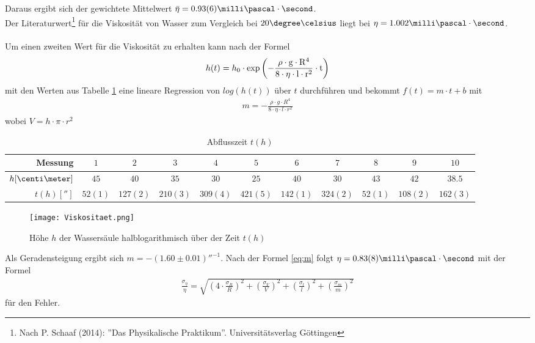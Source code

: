 \documentclass[12pt, a4paper, twoside]{scrartcl}
\begin{document}
Daraus ergibt sich der gewichtete Mittelwert $\bar{\eta}=0.93(6) \milli\pascal\cdot\second$. \\
Der Literaturwert\footnote{Nach P. Schaaf (2014): ”Das Physikalische Praktikum”. Universitätsverlag Göttingen} für die Viskosität von Wasser zum Vergleich bei $20\degree\celsius$ liegt bei $\eta = 1.002 \milli\pascal\cdot\second$.
\\
\\
Um einen zweiten Wert für die Viskosität zu erhalten kann nach der Formel 
\begin{align}
 h(t) = h_0 \cdot \rm{exp}\left(-\frac{\rho\cdot g\cdot R^{4}}{8\cdot\eta\cdot l \cdot r^{2}}\cdot t \right)
\end{align}
mit den Werten aus Tabelle \ref{tab:t(h)} eine lineare Regression von $log\left(h(t)\right)$ über $t$ durchführen und bekommt $f(t)=m\cdot t+b$ mit
\begin{align}
 m=-\frac{\rho\cdot g\cdot R^{4}}{8\cdot\eta\cdot l\cdot r^{2}} \label{eq:m}
\end{align}
wobei $V=h\cdot\pi\cdot r^{2}$

\begin{table}[!h]
\centering
\begin{tabular}{r|c|c|c|c|c|c|c|c|c|c}
     Messung & $1$ & $2$ & $3$ & $4$ & $5$ & $6$ & $7$ & $8$ & $9$ & $10$\\
    \hline
    \hline
    $h[\centi\meter]$ & $45$ & $40$ & $35$ & $30$ & $25$ & $40$ & $30$ & $43$ & $42$ & $38.5$ \\
    \hline
    $t(h)[\second]$ & $52(1)$ & $127(2)$ & $210(3)$ & $309(4)$ & $421(5)$ & $142(1)$ & $324(2)$ & $52(1)$ & $108(2)$ & $162(3)$ \\
    
 \end{tabular} 
 \caption{\label{tab:t(h)}Abflusszeit $t(h)$}
\end{table}

\begin{figure}[!h]
\centering
\texttt{[image: Viskositaet.png]}
\caption{Höhe $h$ der Wassersäule halblogarithmisch über der Zeit $t(h)$}
\end{figure}

Als Geradensteigung ergibt sich $m=-(1.60\pm0.01) \second^{-1}$. Nach der Formel \eqref{eq:m} folgt $\eta = 0.83(8) \milli\pascal\cdot\second$ mit der Formel
\begin{align}
 \frac{\sigma_{\eta}}{\eta}= \sqrt{\left(4\cdot\frac{\sigma_{R}}{R}\right)^2 + \left(\frac{\sigma_{V}}{V}\right)^2 + \left(\frac{\sigma_{l}}{l}\right) ^2 + \left(\frac{\sigma_{m}}{m}\right)^2}  \nonumber
\end{align}
für den Fehler.
\end{document}
